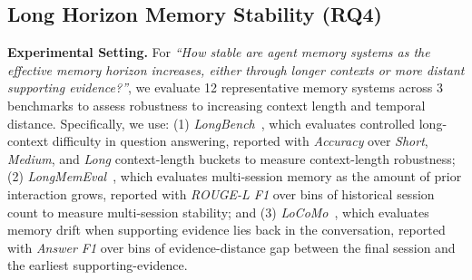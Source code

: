 \documentclass{llmxive}
\begin{document}



\subsection{Long Horizon Memory Stability (RQ4)}
\label{subsec:horizon}

\noindent \textbf{Experimental Setting.}
For \textit{``How stable are agent memory systems as the effective memory horizon increases, either through longer contexts or more distant supporting evidence?''}, we evaluate 12 representative memory systems across 3 benchmarks to assess robustness to increasing context length and temporal distance.
Specifically, we use: (1) \textit{LongBench}~\cite{DBLP:conf/acl/BaiLZL0HDLZHDTL24}, which evaluates controlled long-context difficulty in question answering, reported with \textit{Accuracy} over \textit{Short}, \textit{Medium}, and \textit{Long} context-length buckets to measure context-length robustness;
(2) \textit{LongMemEval}~\cite{wu2024longmemeval}, which evaluates multi-session memory as the amount of prior interaction grows, reported with \textit{ROUGE-L F1} over bins of historical session count to measure multi-session stability; and (3) \textit{LoCoMo}~\cite{maharana2024locomo}, which evaluates memory drift when supporting evidence lies back in the conversation, reported with \textit{Answer F1} over bins of evidence-distance gap between the final session and the earliest supporting-evidence.
\end{document}
